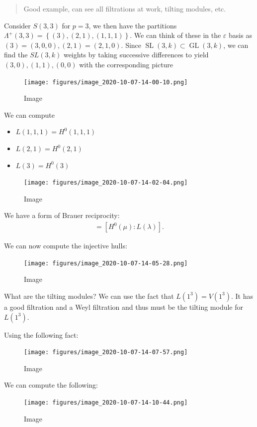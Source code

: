 \begin{example}

\begin{quote}
Good example, can see all filtrations at work, tilting modules, etc.
\end{quote}

Consider \(S(3, 3)\) for \(p=3\), we then have the partitions
\(\Lambda^+(3, 3) = \left\{{(3), (2, 1), (1,1,1)}\right\}\). We can
think of these in the \(\varepsilon\) basis as
\((3) = (3,0,0), (2,1) = (2,1,0)\). Since
\({\operatorname{SL}}(3, k) \subset \operatorname{GL}(3, k)\), we can
find the \(SL(3, k)\) weights by taking successive differences to yield
\((3, 0), (1, 1), (0, 0)\) with the corresponding picture

\begin{figure}
\centering
\texttt{[image: figures/image\_2020-10-07-14-00-10.png]}
\caption{Image}
\end{figure}

We can compute

\begin{itemize}
\tightlist
\item
  \(L(1,1,1) = H^0(1,1,1)\)
\item
  \(L(2, 1) = H^0(2, 1)\)
\item
  \(L(3) = H^0(3)\)
\end{itemize}

\begin{figure}
\centering
\texttt{[image: figures/image\_2020-10-07-14-02-04.png]}
\caption{Image}
\end{figure}

We have a form of Brauer reciprocity:
\begin{align*}  
[I(\lambda): H^0(\mu)] = [H^0(\mu) : L(\lambda) ] 
.\end{align*}

We can now compute the injective hulls:

\begin{figure}
\centering
\texttt{[image: figures/image\_2020-10-07-14-05-28.png]}
\caption{Image}
\end{figure}

What are the tilting modules? We can use the fact that
\(L(1^3) = V(1^3)\). It has a good filtration and a Weyl filtration and
thus must be the tilting module for \(L(1^3)\).

Using the following fact:

\begin{figure}
\centering
\texttt{[image: figures/image\_2020-10-07-14-07-57.png]}
\caption{Image}
\end{figure}

We can compute the following:

\begin{figure}
\centering
\texttt{[image: figures/image\_2020-10-07-14-10-44.png]}
\caption{Image}
\end{figure}

\end{example}

